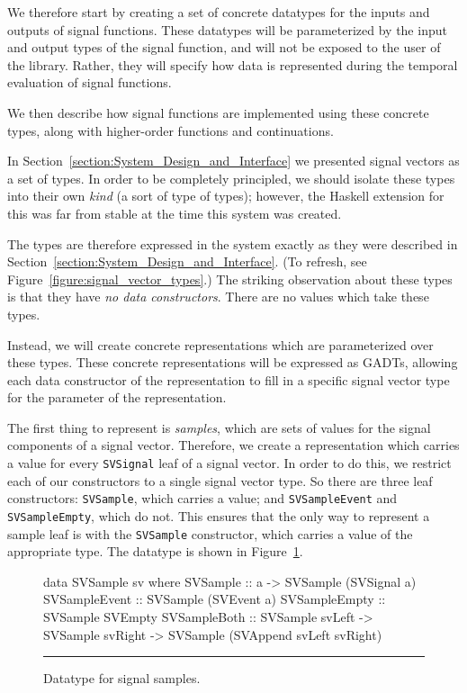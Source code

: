 \documentclass[draft]{llncs}
\begin{document}
We therefore start by creating a set of concrete datatypes for the inputs and
outputs of signal functions. These datatypes will be parameterized by the input
and output types of the signal function, and will not be exposed to the user of
the library. Rather, they will specify how data is represented during the
temporal evaluation of signal functions.

We then describe how signal functions are implemented using these concrete
types, along with higher-order functions and continuations.

In Section~\ref{section:System_Design_and_Interface} we presented signal vectors
as a set of types. In order to be completely principled, we should isolate these
types into their own {\em kind} (a sort of type of types); however, the Haskell
extension for this was far from stable at the time this system was created.

The types are therefore expressed in the system exactly as they were described
in Section~\ref{section:System_Design_and_Interface}. (To refresh, see
Figure~\ref{figure:signal_vector_types}.) The striking observation about these
types is that they have {\em no data constructors}. There are no values which
take these types.

Instead, we will create concrete representations which are parameterized over
these types. These concrete representations will be expressed as GADTs, allowing
each data constructor of the representation to fill in a specific signal vector
type for the parameter of the representation.

The first thing to represent is {\em samples}, which are sets of values for
the signal components of a signal vector. Therefore, we create a representation
which carries a value for every {\tt SVSignal} leaf of a signal vector. In order
to do this, we restrict each of our constructors to a single signal vector type.
So there are three leaf constructors: {\tt SVSample}, which carries a value; and
{\tt SVSampleEvent} and {\tt SVSampleEmpty}, which do not. This ensures that the
only way to represent a sample leaf is with the {\tt SVSample} constructor,
which carries a value of the appropriate type. The datatype is shown in
Figure~\ref{figure:signal_sample_datatype}.

\begin{figure}
\begin{code}
data SVSample sv where
  SVSample      ::    a
                   -> SVSample (SVSignal a)
  SVSampleEvent ::    SVSample (SVEvent a)
  SVSampleEmpty ::    SVSample SVEmpty
  SVSampleBoth  ::    SVSample svLeft
                   -> SVSample svRight
                   -> SVSample (SVAppend svLeft svRight)
\end{code}
\hrule
\caption{Datatype for signal samples.}
\label{figure:signal_sample_datatype}
\end{figure}
\end{document}
